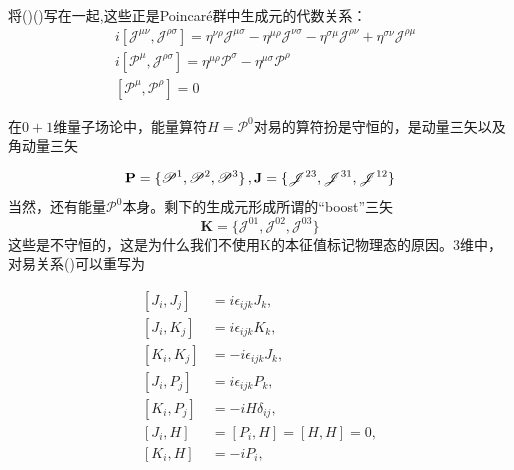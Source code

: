 \begin{tcolorbox}[colback=white!5!,colframe=black!45!]
 将()()写在一起,这些正是Poincar\'e群中生成元的代数关系：
        \begin{subequations}\label{4.6}
            \begin{align}
        &i\left[\mathscr{J}^{\mu\nu},\mathscr{J}^{\rho\sigma} \right]=
        \eta^{\nu\rho}\mathscr{J}^{\mu\sigma}
        -\eta^{\mu\rho}\mathscr{J}^{\nu\sigma}
        -\eta^{\sigma\mu}\mathscr{J}^{\rho\nu}
        +\eta^{\sigma\nu}\mathscr{J}^{\rho\mu}\\
        &i\left[\mathscr{P}^\mu,\mathscr{J}^{\rho\sigma} \right]=
        \eta^{\mu\rho}\mathscr{P}^\sigma-\eta^{\mu\sigma}\mathscr{P}^\rho\\
        &\left[ \mathscr{P}^\mu,\mathscr{P}^\rho\right]=0
    \end{align}
\end{subequations}
\end{tcolorbox}
    \vspace{2ex}
        \begin{center}
            \text{\Large ***}
        \end{center}
    \vspace{2ex}
在$0+1$维量子场论中，能量算符\(H = \mathscr{P}^{0}\)对易的算符扮是守恒的，是动量三矢以及角动量三矢

\[\mathbf{P} = \{\mathscr{P}^{1}, \mathscr{P}^{2}, \mathscr{P}^{3}\}\,,\\
\mathbf{J} = \{\mathscr{J}^{23}, \mathscr{J}^{31}, \mathscr{J}^{12}\}\]
当然，还有能量\(\mathscr{P}^{0}\)本身。剩下的生成元形成所谓的“boost”三矢
\[\mathbf{K} = \{\mathscr{J}^{01}, \mathscr{J}^{02}, \mathscr{J}^{03}\}\]
这些是不守恒的，这是为什么我们不使用K的本征值标记物理态的原因。3维中，对易关系()可以重写为

\begin{subequations}
    \begin{align}
        [J_{i}, J_{j}] &= i\epsilon_{ijk} J_{k} , \\
        [J_{i}, K_{j}] &= i\epsilon_{ijk} K_{k} , \\
        [K_{i}, K_{j}] &= -i\epsilon_{ijk} J_{k} , \\
        [J_{i}, P_{j}] &= i\epsilon_{ijk} P_{k} , \\
        [K_{i}, P_{j}] &= -i H \delta_{ij} , \\
        [J_{i}, H] &= [P_{i}, H] = [H, H] = 0 , \\
        [K_{i}, H] &= -i P_{i} ,
    \end{align}
\end{subequations}

